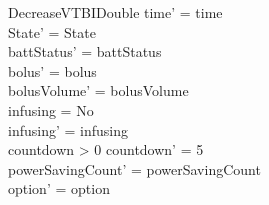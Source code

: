 \begin{schema}{DecreaseVTBIDouble}
	time' = time\\ 
	\pagebreak
	State' = State\\
	battStatus' = battStatus\\
	bolus' = bolus\\
	bolusVolume' = bolusVolume\\
	infusing = No\\
	infusing' = infusing\\
	countdown > 0 \land countdown' = 5\\
	powerSavingCount' = powerSavingCount\\ option' = option\\
\end{schema}

